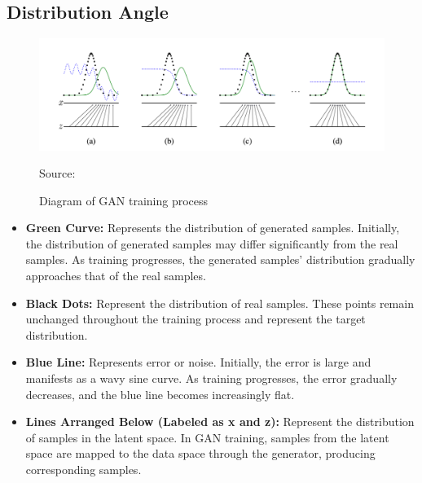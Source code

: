 \subsection*{Distribution Angle}



\begin{figure}[H]
    \centering
    \includegraphics[width=1.2\linewidth]{./Images/data_distribution.jpg}
    \caption{Diagram of GAN training process}
    \label{fig:my_picture}
    \vspace{1pt} %
    \small{Source: \cite{goodfellow2014generative}}
\end{figure}


\begin{itemize}
    \item \textbf{ Green Curve:} Represents the distribution of generated samples. Initially, the distribution of generated samples may differ significantly from the real samples. As training progresses, the generated samples’ distribution gradually approaches that of the real samples.
    \item \textbf{Black Dots:} Represent the distribution of real samples. These points remain unchanged throughout the training process and represent the target distribution.
    \item \textbf{ Blue Line:} Represents error or noise. Initially, the error is large and manifests as a wavy sine curve. As training progresses, the error gradually decreases, and the blue line becomes increasingly flat.
    \item \textbf{ Lines Arranged Below (Labeled as x and z):} Represent the distribution of samples in the latent space. In GAN training, samples from the latent space are mapped to the data space through the generator, producing corresponding samples.
\end{itemize}


